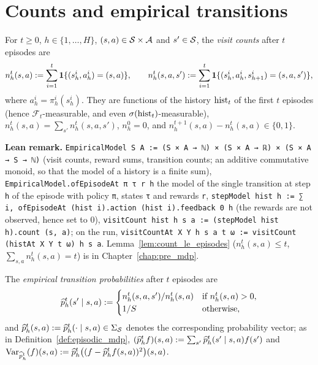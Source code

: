 \section{Counts and empirical transitions}
\label{sec:empirical_counts}

\begin{definition}\label{def:counts}
\leanok
{}
For $t \ge 0$, $h \in \{1, \dots, H\}$, $(s, a) \in \mathcal{S} \times \mathcal{A}$ and $s' \in \mathcal{S}$, the
\emph{visit counts} after $t$ episodes are
\[
  n_h^t(s, a) := \sum_{i = 1}^{t} \mathbf{1}\{(s^i_h, a^i_h) = (s, a)\},
  \qquad
  n_h^t(s, a, s') := \sum_{i = 1}^{t} \mathbf{1}\{(s^i_h, a^i_h, s^i_{h+1}) = (s, a, s')\},
\]
where $a^i_h = \pi^i_h(s^i_h)$. They are functions of the history $\mathrm{hist}_t$ of the first $t$
episodes (hence $\mathcal F_t$-measurable, and even $\sigma(\mathrm{hist}_t)$-measurable),
$n_h^t(s, a) = \sum_{s'} n_h^t(s, a, s')$, $n_h^0 = 0$, and $n_h^{t+1}(s, a) - n_h^t(s, a) \in \{0, 1\}$.
\end{definition}

\textbf{Lean remark.} \texttt{EmpiricalModel S A := (S × A → ℕ) × (S × A → ℝ) × (S × A → S → ℕ)}
(visit counts, reward sums, transition counts; an additive commutative monoid, so that the
model of a history is a finite sum), \texttt{EmpiricalModel.ofEpisodeAt π τ r h} the model of
the single transition at step \texttt{h} of the episode with policy \texttt{π}, states
\texttt{τ} and rewards \texttt{r}, \texttt{stepModel hist h := ∑ i, ofEpisodeAt (hist i).action (hist i).feedback 0 h}
(the rewards are not observed, hence set to $0$), \texttt{visitCount hist h s a := (stepModel hist h).count (s, a)};
on the run, \texttt{visitCountAt X Y h s a t ω := visitCount (histAt X Y t ω) h s a}.
Lemma~\ref{lem:count_le_episodes} ($n_h^t(s, a) \le t$, $\sum_{s, a} n_h^t(s, a) = t$) is in
Chapter~\ref{chap:pre_mdp}.

\begin{definition}\label{def:emp_trans}
\leanok
{}
The \emph{empirical transition probabilities} after $t$ episodes are
\[
  \widehat{p}_h^t(s' \mid s, a) :=
  \begin{cases}
    n_h^t(s, a, s') / n_h^t(s, a) & \text{if } n_h^t(s, a) > 0, \\
    1/S & \text{otherwise},
  \end{cases}
\]
and $\widehat{p}_h^t(s, a) := \widehat{p}_h^t(\cdot \mid s, a) \in \Sigma_{\mathcal{S}}$ denotes the corresponding
probability vector; as in Definition~\ref{def:episodic_mdp}, $(\widehat{p}_h^t f)(s, a) := \sum_{s'} \widehat{p}_h^t(s' \mid s, a) f(s')$
and $\operatorname{Var}_{\widehat{p}_h^t}(f)(s, a) := \widehat{p}_h^t\big((f - \widehat{p}_h^t f(s, a))^2\big)(s, a)$.
\end{definition}

